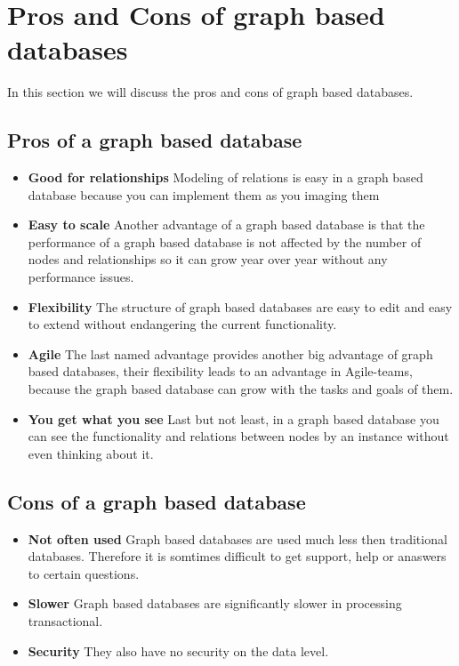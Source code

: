 
\section{Pros and Cons of graph based databases}\label{sec:pros-and-cons-of-graph-based-databases}
In this section we will discuss the pros and cons of graph based databases.
\subsection{Pros of a graph based database}\label{subsec:pros-of-a-graph-based-database}\label{subsec:pros}
\begin{itemize}
    \item \textbf{Good for relationships} Modeling of relations is easy in a graph based database because you can implement them as you imaging them
    \item \textbf{Easy to scale} Another advantage of a graph based database is that the performance of a graph based database is not affected by the number of nodes and relationships so it can grow year over year without any performance issues.
    \item \textbf{Flexibility} The structure of graph based databases are easy to edit and easy to extend without endangering the current functionality.
    \item \textbf{Agile} The last named advantage provides another big advantage of graph based databases, their flexibility leads to an advantage in Agile-teams, because the graph based database can grow with the tasks and goals of them.
    \item \textbf{You get what you see} Last but not least, in a graph based database you can see the functionality and relations between nodes by an instance without even thinking about it.
\end{itemize}
\subsection{Cons of a graph based database}\label{subsec:cons-of-a-graph-based-database}\label{subsec:cons}
\begin{itemize}
    \item \textbf{Not often used} Graph based databases are used much less then traditional databases. Therefore it is somtimes difficult to get support, help or anaswers to certain questions.
    \item \textbf{Slower} Graph based databases are significantly slower in processing transactional.
    \item  \textbf{Security} They also have no security on the data level.
\end{itemize}


